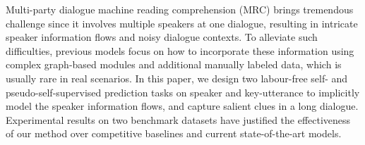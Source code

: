 Multi-party dialogue machine reading comprehension (MRC) brings tremendous challenge since it involves multiple speakers at one dialogue, resulting in intricate speaker information flows and noisy dialogue contexts. To alleviate such difficulties, previous models focus on how to incorporate these information using complex graph-based modules and additional manually labeled data, which is usually rare in real scenarios. In this paper, we design two labour-free self- and pseudo-self-supervised prediction tasks on speaker and key-utterance to implicitly model the speaker information flows, and capture salient clues in a long dialogue. Experimental results on two benchmark datasets have justified the effectiveness of our method over competitive baselines and current state-of-the-art models.
